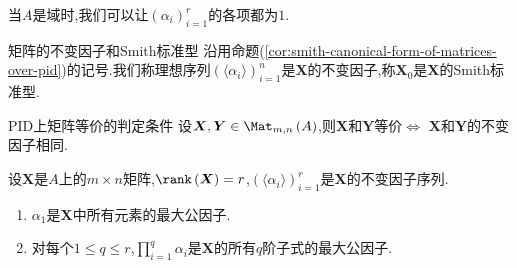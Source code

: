 \begin{remark}{}{}
	当$A$是域时,我们可以让$\left(\alpha_{i}\right)_{i=1}^{r}$的各项都为$1$.
\end{remark}

\begin{definition}{矩阵的不变因子和Smith标准型}{}
	沿用命题(\cref{cor:smith-canonical-form-of-matrices-over-pid})的记号.我们称理想序列$\left(\langle\alpha_{i}\rangle\right)_{i=1}^{n}$是$\boldsymbol{X}$的不变因子,称$\boldsymbol{X}_{0}$是$\boldsymbol{X}$的Smith标准型.
\end{definition}

\begin{corollary}{PID上矩阵等价的判定条件}{}
	设$\boldsymbol{X},\boldsymbol{Y}\in\Mat_{m,n}\left(A\right)$,则$\boldsymbol{X}$和$\boldsymbol{Y}$等价$\iff$ $\boldsymbol{X}$和$\boldsymbol{Y}$的不变因子相同.
\end{corollary}

\begin{proposition}{}{}
	设$\boldsymbol{X}$是$A$上的$m\times n$矩阵,$\rank\left(\boldsymbol{X}\right)=r$,$\left(\langle\alpha_{i}\rangle\right)_{i=1}^{r}$是$\boldsymbol{X}$的不变因子序列.
	\begin{enumerate}
		\item $\alpha_{1}$是$\boldsymbol{X}$中所有元素的最大公因子.
		\item 对每个$1\leq q\leq r$,$\prod\limits_{i=1}^{q}\alpha_{i}$是$\boldsymbol{X}$的所有$q$阶子式的最大公因子.
	\end{enumerate}
\end{proposition}














